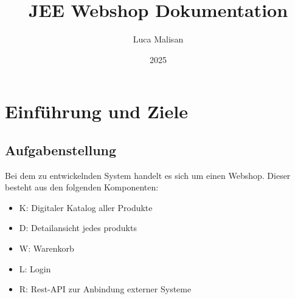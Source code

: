 \documentclass[
]{article}
\title{JEE Webshop Dokumentation}
\author{Luca Malisan}
\date{2025}
\begin{document}
\maketitle


\section{}


\hypertarget{section-introduction-and-goals}{%
\section{Einführung und Ziele}\label{section-introduction-and-goals}}


\hypertarget{_aufgabenstellung}{%
\subsection{Aufgabenstellung}\label{_aufgabenstellung}}
Bei dem zu entwickelnden System handelt es sich um einen Webshop. Dieser besteht aus den folgenden Komponenten:
\begin{itemize}
\item K: Digitaler Katalog aller Produkte
\item D: Detailansicht jedes produkts
\item W: Warenkorb
\item L: Login
\item R: Rest-API zur Anbindung externer Systeme
\end{itemize}
\end{document}
